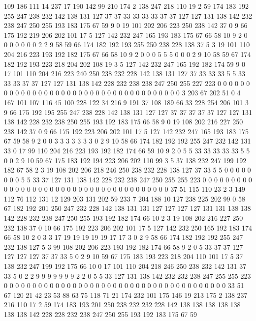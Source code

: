 109 186 111 14 237 17 190 142 99 210 174 2 138 247 218 110 19 2 59 174
183 192 255 247 238 232 142 138 131 127 37 37 33 33 33 33 37 37 127 127
131 138 142 232 238 247 250 255 193 183 175 67 59 9 0 19 101 202 206 223
250 238 142 37 0 9 66 175 192 219 206 202 101 17 5 127 142 232 247 165
193 183 175 67 66 58 10 9 2 0 0 0 0 0 0 0 2 2 9 58
59 66 174 182 192 193 255 250 238 228 138 37 5 3 19 101 110 204 216 223
193 192 182 175 67 66 58 10 9 2 0 0 0 5 5 5 0 0 0 2
9 10 58 59 67 174 182 192 193 223 218 204 202 108 19 3 5 127 142 232
247 165 192 182 174 59 9 0 17 101 110 204 216 223 240 250 238 232 228 142
138 131 127 37 33 33 33 5 5 33 33 33 37 37 127 127 131 138 142 228
232 238 238 247 250 255 227 223 0 0 0 0 0 0 0 0 0 0 0 0
0 0 0 0 0 0 0 0 0 0 0 0 0 0 0 0 0 0 0 0
0 0 0 0 0 3 203 67 202 51 0 4 167 101 107 116 45 100 228 122
34 216 9 191 37 108 189 66 33 228 254 206 101 3 9 66 175 192 195 255
247 238 228 142 138 131 127 127 37 37 37 37 37 127 127 131 138 142 228 232
238 250 255 193 192 183 175 66 58 9 0 19 108 202 216 227 250 238 142 37
0 9 66 175 192 223 206 202 101 17 5 127 142 232 247 165 193 183 175 67
59 58 9 2 0 0 3 3 3 3 3 3 3 0 2 9 10 58 66 174
182 192 192 255 247 232 142 131 33 0 17 99 110 204 216 223 193 192 182 174
66 59 10 9 2 0 5 5 33 33 33 33 33 5 5 0 0 2 9 10
59 67 175 183 192 194 223 206 202 110 99 3 5 37 138 232 247 199 192 182
67 58 2 3 19 108 202 206 218 246 250 238 232 228 138 127 37 33 5 5
0 0 0 0 0 0 0 0 5 5 33 37 127 131 138 142 228 232 238 247
250 255 255 223 0 0 0 0 0 0 0 0 0 0 0 0 0 0 0 0
0 0 0 0 0 0 0 0 0 0 0 0 0 0 0 0 0 0 0 0
0 0 37 51 115 110 23 2 3 149 112 76 112 131 12 129 203 131 202 59
233 7 204 188 10 127 238 225 202 99 0 58 67 182 192 201 250 247 232 228
142 138 131 131 127 127 127 127 131 131 138 138 142 228 232 238 247 250 255 193
192 182 174 66 10 2 3 19 108 202 216 227 250 232 138 37 0 10 66 175
192 223 206 202 101 17 5 127 142 232 250 165 192 183 174 66 58 10 2 0
3 3 17 19 19 19 19 19 17 17 3 0 2 9 58 66 174 182 192 192
255 247 232 138 127 5 3 99 108 202 206 223 193 192 182 174 66 58 9 2
0 5 33 37 37 127 127 127 127 37 37 33 5 0 2 9 10 59 67 175
183 193 223 218 204 110 101 17 5 37 138 232 247 199 192 175 66 10 0 17
101 110 204 218 246 250 238 232 142 131 37 33 5 0 2 2 9 9 9 9
9 9 9 2 2 0 5 5 33 127 131 138 142 232 232 238 247 255 255 223
0 0 0 0 0 0 0 0 0 0 0 0 0 0 0 0 0 0 0 0
0 0 0 0 0 0 0 0 0 0 0 0 0 0 0 0 0 0 0 33
51 67 120 21 42 23 53 88 63 75 118 71 21 174 232 101 175 146 19 213
175 2 138 237 216 110 17 2 59 174 183 193 201 250 238 232 232 228 142 138
138 138 138 138 138 138 142 228 228 232 238 247 250 255 193 192 183 175 67 59
